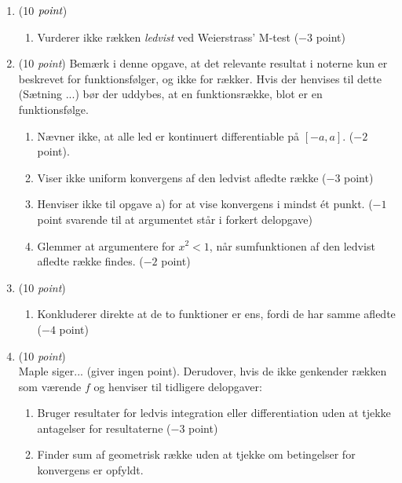 \documentclass{article}
\begin{document}
\begin{opg}\hfill
	\begin{enumerate}
		\item (10 $ \emph{point} $)
		\begin{enumerate}[label=(\roman*)]
			\item Vurderer ikke rækken \emph{ledvist} ved Weierstrass' M-test ($ -3 $ point)
		\end{enumerate}
		\item (10 \emph{point}) Bemærk i denne opgave, at det relevante resultat i noterne kun er beskrevet for funktionsfølger, og ikke for rækker. Hvis der henvises til dette (Sætning ...) bør der uddybes, at en funktionsrække, blot er en funktionsfølge.
		\begin{enumerate}[label=(\roman*)] 
			\item Nævner ikke, at alle led er kontinuert differentiable på $ [-a,a] $. ($ -2 $ point).
			\item Viser ikke uniform konvergens af den ledvist afledte række ($ -3 $ point)
			\item Henviser ikke til opgave a) for at vise konvergens i mindst ét punkt. ($ -1 $ point svarende til at argumentet står i forkert delopgave)
			\item Glemmer at argumentere for $ x^2<1 $, når sumfunktionen af den ledvist afledte række findes. ($ -2 $ point) 
		\end{enumerate}
		\item (10 \emph{point})
		\begin{enumerate}[label=(\roman*)]
			\item Konkluderer direkte at de to funktioner er ens, fordi de har samme afledte ($ -4 $ point)
		\end{enumerate}
		\item (10 \emph{point})\hfill\\
		Maple siger... (giver ingen point). Derudover, hvis de ikke genkender rækken som værende $ f $ og henviser til tidligere delopgaver:
		\begin{enumerate}[label=(\roman*)]
			\item Bruger resultater for ledvis integration eller differentiation uden at tjekke antagelser for resultaterne ($ -3 $ point)
			\item Finder sum af geometrisk række uden at tjekke om betingelser for konvergens er opfyldt.
		\end{enumerate}
		
	\end{enumerate}
\end{opg}
\end{document}
